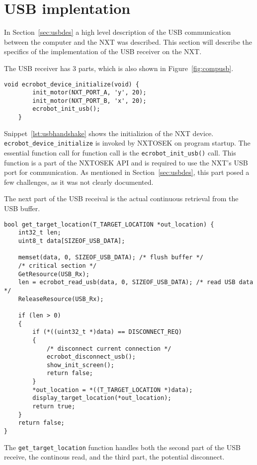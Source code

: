 \section{USB implentation}
\label{sec:usbimp}
In Section~\ref{sec:usbdes} a high level description of the USB communication between the computer and the NXT was described.
This section will describe the specifics of the implementation of the USB receiver on the NXT.

The USB receiver has 3 parts, which is also shown in Figure~\ref{fig:compusb}.

\begin{lstlisting}[language=CSharp,label={lst:usbhandshake},caption={ecrobot\_device\_initialize method from nxt.c}]
    void ecrobot_device_initialize(void) {
        init_motor(NXT_PORT_A, 'y', 20);
        init_motor(NXT_PORT_B, 'x', 20);
        ecrobot_init_usb();
    }
\end{lstlisting}
Snippet~\ref{lst:usbhandshake} shows the initializion of the NXT device.
\texttt{ecrobot\_device\_initialize} is invoked by NXTOSEK on program startup.
The essential function call for function call is the \texttt{ecrobot\_init\_usb()} call.
This function is a part of the NXTOSEK API and is required to use the NXT's USB port for communication.
As mentioned in Section~\ref{sec:usbdes}, this part posed a few challenges, as it was not clearly documented.

The next part of the USB receival is the actual continuous retrieval from the USB buffer.
\begin{lstlisting}[language=CSharp,label={lst:usbreceive},caption={get\_target\_location method from data\_receive.c}]
    bool get_target_location(T_TARGET_LOCATION *out_location) {
	int32_t len;
	uint8_t data[SIZEOF_USB_DATA];

    memset(data, 0, SIZEOF_USB_DATA); /* flush buffer */
	/* critical section */
	GetResource(USB_Rx);
	len = ecrobot_read_usb(data, 0, SIZEOF_USB_DATA); /* read USB data */
	ReleaseResource(USB_Rx);

	if (len > 0)
	{
		if (*((uint32_t *)data) == DISCONNECT_REQ)
		{
			/* disconnect current connection */
			ecrobot_disconnect_usb();
			show_init_screen();
			return false;
		}
		*out_location = *((T_TARGET_LOCATION *)data);
		display_target_location(*out_location);
		return true;
	}
	return false;
}
\end{lstlisting}
The \texttt{get\_target\_location} function handles both the second part of the USB receive, the continous read, and the third part, the potential disconnect.

